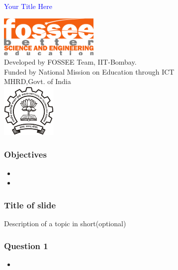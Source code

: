 \documentclass[presentation]{beamer}
\title{}
\author{FOSSEE}
\date{}
\begin{document}
\begin{frame}

\begin{center}
\vspace{12pt}
\textcolor{blue}{\huge Your Title Here}
\end{center}
\vspace{18pt}
\begin{center}
\vspace{10pt}
\includegraphics[scale=0.95]{../images/fossee-logo.png}\\
\vspace{5pt}
\scriptsize Developed by FOSSEE Team, IIT-Bombay. \\ 
\scriptsize Funded by National Mission on Education through ICT\\
\scriptsize  MHRD,Govt. of India\\
\includegraphics[scale=0.30]{../images/iitb-logo.png}\\
\end{center}
\end{frame}
\begin{frame}
\frametitle{Objectives}
\label{sec-2}


\begin{itemize}
\item 
\item  
\end{itemize}
\end{frame}
\begin{frame}
\frametitle{Title of slide}
\label{sec-3}

  Description of a topic in short(optional)
\end{frame}
\begin{frame}
\frametitle{Question 1}
\label{sec-4}


\begin{itemize}
\item 
\end{itemize}
\end{frame}
\end{document}
